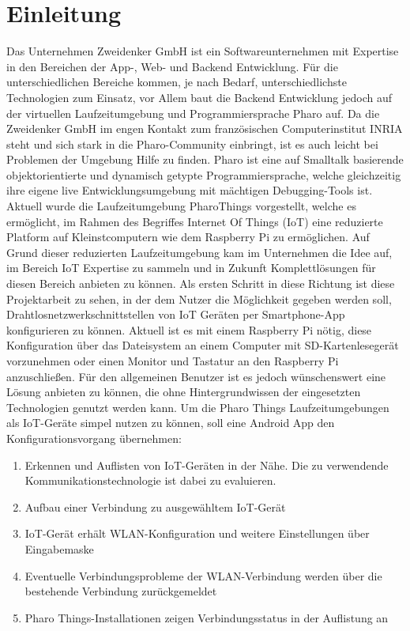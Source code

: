 \section{Einleitung}
	Das Unternehmen Zweidenker GmbH ist ein Softwareunternehmen mit Expertise in den Bereichen der App-, Web- und Backend Entwicklung. \cite{zweidenker}
	Für die unterschiedlichen Bereiche kommen, je nach Bedarf, unterschiedlichste Technologien zum Einsatz, vor Allem baut die Backend Entwicklung jedoch auf der virtuellen Laufzeitumgebung und Programmiersprache Pharo auf.
	Da die Zweidenker GmbH im engen Kontakt zum französischen Computerinstitut INRIA steht und sich stark in die Pharo-Community einbringt, ist es auch leicht bei Problemen der Umgebung Hilfe zu finden. 
	Pharo ist eine auf Smalltalk basierende objektorientierte und dynamisch getypte Programmiersprache,
    welche gleichzeitig ihre eigene live Entwicklungsumgebung mit mächtigen Debugging-Tools ist. \cite{pharo}
    Aktuell wurde die Laufzeitumgebung PharoThings\cite{pharoThings} vorgestellt, welche es ermöglicht, im Rahmen des Begriffes Internet Of Things (IoT) eine reduzierte Platform auf Kleinstcomputern wie dem Raspberry Pi zu ermöglichen.
    Auf Grund dieser reduzierten Laufzeitumgebung kam im Unternehmen die Idee auf, im Bereich IoT Expertise zu sammeln und in Zukunft Komplettlösungen für diesen Bereich anbieten zu können. Als ersten Schritt in diese Richtung ist diese Projektarbeit zu sehen, in der dem Nutzer die Möglichkeit gegeben werden soll, Drahtlosnetzwerkschnittstellen von IoT Geräten per Smartphone-App konfigurieren zu können. Aktuell ist es mit einem Raspberry Pi nötig, diese Konfiguration über das Dateisystem an einem Computer mit SD-Kartenlesegerät vorzunehmen oder einen Monitor und Tastatur an den Raspberry Pi anzuschließen. Für den allgemeinen Benutzer ist es jedoch wünschenswert eine Lösung anbieten zu können, die ohne Hintergrundwissen der eingesetzten Technologien genutzt werden kann.
    Um die Pharo Things Laufzeitumgebungen als IoT-Geräte simpel nutzen zu können, soll eine Android App den Konfigurationsvorgang übernehmen:
    \begin{enumerate}
        \item Erkennen und Auflisten von IoT-Geräten in der Nähe. Die zu verwendende Kommunikationstechnologie ist dabei zu evaluieren.
        \item Aufbau einer Verbindung zu ausgewähltem IoT-Gerät
        \item IoT-Gerät erhält WLAN-Konfiguration und weitere Einstellungen über Eingabemaske
        \item Eventuelle Verbindungsprobleme der WLAN-Verbindung werden über die bestehende Verbindung zurückgemeldet
        \item Pharo Things-Installationen zeigen Verbindungsstatus in der Auflistung an
    \end{enumerate}
